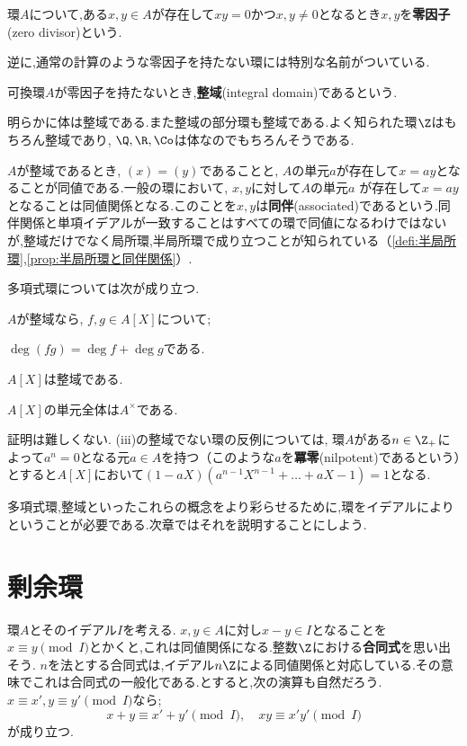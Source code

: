 \begin{defi}[零因子]
	環$A$について,ある$x,y\in A$が存在して$xy=0$かつ$x,y\neq0$となるとき$x,y$を\textbf{零因子}(zero divisor)という.
\end{defi}

逆に,通常の計算のような零因子を持たない環には特別な名前がついている.

\begin{defi}[整域]
	可換環$A$が零因子を持たないとき,\textbf{整域}(integral domain)であるという.
\end{defi}

明らかに体は整域である.また整域の部分環も整域である.よく知られた環$\Z$はもちろん整域であり, $\Q,\R,\Co$は体なのでもちろんそうである.

$A$が整域であるとき, $(x)=(y)$であることと, $A$の単元$a$が存在して$x=ay$となることが同値である.一般の環において, $x,y$に対して$A$の単元$a$
が存在して$x=ay$となることは同値関係となる.このことを$x,y$は\textbf{同伴}(associated)であるという.同伴関係と単項イデアルが一致することはすべての環で同値になるわけではないが,整域だけでなく局所環,半局所環で成り立つことが知られている（\ref{defi:半局所環},\ref{prop:半局所環と同伴関係}）.

多項式環については次が成り立つ.

\begin{prop}
	$A$が整域なら, $f,g\in A[X]$について;
	\begin{sakura}
		\item $\deg(fg)=\deg f+\deg g$である.
		\item $A[X]$は整域である.
		\item $A[X]$の単元全体は$A^\times$である.
	\end{sakura}
\end{prop}

証明は難しくない. (iii)の整域でない環の反例については, 環$A$がある$n\in\Z_+$によって$a^n=0$となる元$a\in A$を持つ（このような$a$を\textbf{冪零}(nilpotent)であるという）とすると$A[X]$において$(1-aX)(a^{n-1}X^{n-1}+\dots+aX-1)=1$となる.

多項式環,整域といったこれらの概念をより彩らせるために,環をイデアルによりということが必要である.次章ではそれを説明することにしよう.

\section{剰余環}

環$A$とそのイデアル$I$を考える. $x,y\in A$に対し$x-y\in I$となることを$x\equiv y \pmod I$とかくと,これは同値関係になる.整数$\Z$における\textbf{合同式}を思い出そう. $n$を法とする合同式は,イデアル$n\Z$による同値関係と対応している.その意味でこれは合同式の一般化である.とすると,次の演算も自然だろう. $x\equiv x',y\equiv y'\pmod I$なら;
\[x+y\equiv x'+y'\pmod I,\quad xy\equiv x'y'\pmod I\]
が成り立つ.


